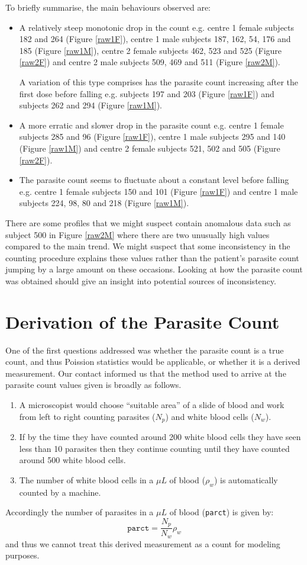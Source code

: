 \pagebreak
To briefly summarise, the main behaviours observed are:
\begin{itemize}
\item A relatively steep monotonic drop in the count e.g. centre 1 female subjects 182 and 264 (Figure \ref{raw1F}), centre 1 male subjects 187, 162, 54, 176 and 185 (Figure \ref{raw1M}), centre 2 female subjects 462, 523 and 525 (Figure \ref{raw2F}) and centre 2 male subjects 509, 469 and 511 (Figure \ref{raw2M}).

A variation of this type comprises has the parasite count increasing after the first dose before falling e.g. subjects 197 and 203 (Figure \ref{raw1F}) and subjects 262 and 294 (Figure \ref{raw1M}). 
\item A more erratic and slower drop in the parasite count e.g. centre 1 female subjects 285 and 96 (Figure \ref{raw1F}), centre 1 male subjects 295 and 140 (Figure \ref{raw1M}) and centre 2 female subjects 521, 502 and 505 (Figure \ref{raw2F}). 
\item The parasite count seems to fluctuate about a constant level before falling e.g. centre 1 female subjects 150 and 101 (Figure \ref{raw1F}) and centre 1 male subjects 224, 98, 80 and 218 (Figure \ref{raw1M}). 
\end{itemize}
There are some profiles that we might suspect contain anomalous data such as subject 500 in Figure \ref{raw2M} where there are two unusually high values compared to the main trend. We might suspect that some inconsistency in the counting procedure explains these values rather than the patient's parasite count jumping by a large amount on these occasions. Looking at how the parasite count was obtained should give an insight into potential sources of inconsistency.
\section{Derivation of the Parasite Count}
One of the first questions addressed was whether the parasite count is a true count, and thus Poission statistics would be applicable, or whether it is a derived measurement. Our contact informed us that the method used to arrive at the parasite count values given is broadly as follows.
\begin{enumerate}
 \item A microscopist would choose ``suitable area'' of a slide of blood and work from left to right counting parasites ($N_p$) and white blood cells ($N_w$).
\item If by the time they have counted around 200 white blood cells they have seen less than 10 parasites then they continue counting until they have counted around 500 white blood cells.
\item The number of white blood cells in a $\mu L$ of blood ($\rho_w$) is automatically counted by a machine.
\end{enumerate}
Accordingly the number of parasites in a $\mu L$ of blood (\texttt{parct}) is given by:
$$\mathtt{parct}=\frac{N_p}{N_w}\rho_w$$
and thus we cannot treat this derived measurement as a count for modeling purposes.
